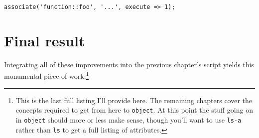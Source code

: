 \documentclass{report}
\begin{document}
\begin{verbatim}
associate('function::foo', '...', execute => 1);
\end{verbatim}

\section{Final result}\label{sec:some-improvements-final-result}
    Integrating all of these improvements into the previous chapter's script yields this monumental piece of work:\footnote{This is the last full listing I'll provide here. The remaining
    chapters cover the concepts required to get from here to {\tt object}. At this point the stuff going on in {\tt object} should more or less make sense, though you'll want to use {\tt ls-a}
    rather than {\tt ls} to get a full listing of attributes.}
\end{document}
